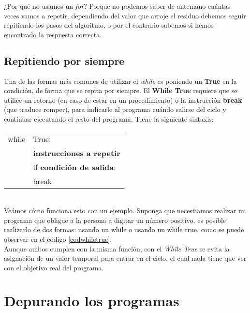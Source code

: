 

¿Por qué no usamos un \emph{for}? Porque no podemos saber de antemano cuántas veces vamos a repetir, dependiendo del valor que arroje el residuo debemos seguir repitiendo los pasos del algoritmo, o por el contrario sabemos si hemos encontrado la respuesta correcta.

\subsection{Repitiendo por siempre}

Una de las formas más comunes de utilizar el \emph{while} es poniendo un \textbf{True} en la condición, de forma que se repita por siempre. El \textbf{While True} requiere que se utilice un retorno (en caso de estar en un procedimiento) o la instrucción \textbf{break} (que traduce romper), para indicarle al programa cuándo salirse del ciclo y continuar ejecutando el resto del programa. Tiene la siguiente sintaxis: \\

\begin{tabular}{l l}
	while & True:  \\
	& \textbf{instrucciones a repetir}  \\
	& if \textbf{condición de salida}:  \\
	&    \hspace{1cm} break \\
\end{tabular} \\

Veámos cómo funciona esto con un ejemplo. Suponga que necestiamos realizar un programa que obligue a la persona a digitar un número positivo, es posible realizarlo de dos formas: usando un while o usando un while true, como se puede observar en el código \ref{codwhiletrue}. \\



Aunque ambos cumplen con la misma función, con el \emph{While True} se evita la asignación de un valor temporal para entrar en el ciclo, el cuál nada tiene que ver con el objetivo real del programa.

\section{Depurando los programas}

